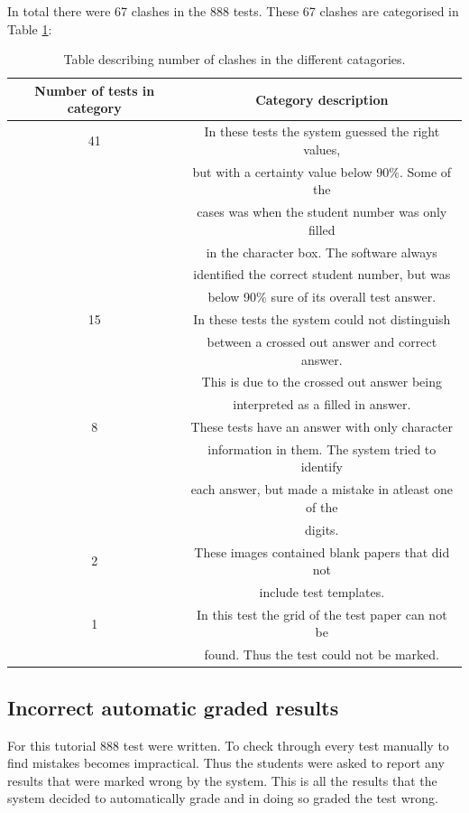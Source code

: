 In total there were 67 clashes in the 888 tests. These 67 clashes are categorised in Table  \ref{tbl:TutClash}:
\begin{table}
  \centering
\begin{tabular}{|c|c|}
\hline
\textbf{Number of tests in category} & \textbf{Category description}\\
\hline
41&In these tests the system guessed the right values,\\ 
&but with a certainty value below 90\%. Some of the\\
&cases was when the student number was only filled\\
&in the character box. The software always\\
&identified the correct student number, but was\\
&below 90\% sure of its overall test answer.\\
\hline
15&In these tests the system could not distinguish\\ 
&between a crossed out answer and correct answer.\\
&This is due to the crossed out answer being\\
&interpreted as a filled in answer.\\
\hline
8&These tests have an answer with only character\\ 
&information in them. The system tried to identify\\
&each answer, but made a mistake in atleast one of the\\
&digits.\\
\hline
2&These images contained blank papers that did not\\ 
&include test templates.\\
\hline
1&In this test the grid of the test paper can not be\\ 
&found. Thus the test could not be marked.\\
\hline
\end{tabular}
  \caption{Table describing number of clashes in the different catagories.} \label{tbl:TutClash}
\end{table}

\subsection{Incorrect automatic graded results}

For this tutorial 888 test were written. To check through every test manually to find mistakes becomes impractical. Thus the students were asked to report any results that were marked wrong by the system. This is all the results that the system decided to automatically grade and in doing so graded the test wrong.

